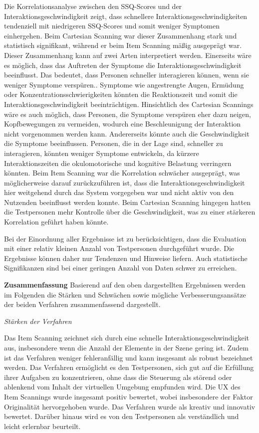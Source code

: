 Die Korrelationsanalyse zwischen den SSQ-Scores und der Interaktionsgeschwindigkeit zeigt, dass schnellere Interaktionsgeschwindigkeiten tendenziell mit niedrigeren SSQ-Scores und somit weniger Symptomen einhergehen. Beim Cartesian Scanning war dieser Zusammenhang stark und statistisch signifikant, während er beim Item Scanning mäßig ausgeprägt war. Dieser Zusammenhang kann auf zwei Arten interpretiert werden. Einerseits wäre es möglich, dass das Auftreten der Symptome die Interaktionsgeschwindigkeit beeinflusst. Das bedeutet, dass Personen schneller interagieren können, wenn sie weniger Symptome verspüren.. Symptome wie angestrengte Augen, Ermüdung oder Konzentrationsschwierigkeiten könnten die Reaktionszeit und somit die Interaktionsgeschwindigkeit beeinträchtigen. Hinsichtlich des Cartesian Scannings wäre es auch möglich, dass Personen, die Symptome verspüren eher dazu neigen, Kopfbewegungen zu vermeiden, wodurch eine Beschleunigung der Interaktion nicht vorgenommen werden kann. Andererseits könnte auch die Geschwindigkeit die Symptome beeinflussen. Personen, die in der Lage sind, schneller zu interagieren, könnten weniger Symptome entwickeln, da kürzere Interaktionszeiten die okulomotorische und kognitive Belastung verringern könnten.
Beim Item Scanning war die Korrelation schwächer ausgeprägt, was möglicherweise darauf zurückzuführen ist, dass die Interaktionsgeschwindigkeit hier weitgehend durch das System vorgegeben war und nicht aktiv von den Nutzenden beeinflusst werden konnte. Beim Cartesian Scanning hingegen hatten die Testpersonen mehr Kontrolle über die Geschwindigkeit, was zu einer stärkeren Korrelation geführt haben könnte.

Bei der Einordnung aller Ergebnisse ist zu berücksichtigen, dass die Evaluation mit einer relativ kleinen Anzahl von Testpersonen durchgeführt wurde. Die Ergebnisse können daher nur Tendenzen und Hinweise liefern. Auch statistische Signifikanzen sind bei einer geringen Anzahl von Daten schwer zu erreichen. 

\textbf{Zusammenfassung}
Basierend auf den oben dargestellten Ergebnissen werden im Folgenden die Stärken und Schwächen sowie mögliche Verbesserungsansätze der beiden Verfahren zusammenfassend dargestellt.

\textit{Stärken der Verfahren}

Das Item Scanning zeichnet sich durch eine schnelle Interaktionsgeschwindigkeit aus, insbesondere wenn die Anzahl der Elemente in der Szene gering ist. Zudem ist das Verfahren weniger fehleranfällig und kann insgesamt als robust bezeichnet werden. Das Verfahren ermöglicht es den Testpersonen, sich gut auf die Erfüllung ihrer Aufgaben zu konzentrieren, ohne dass die Steuerung als störend oder ablenkend vom Inhalt der virtuellen Umgebung empfunden wird. Die UX des Item Scannings wurde insgesamt positiv bewertet, wobei insbesondere der Faktor Originalität hervorgehoben wurde. Das Verfahren wurde als kreativ und innovativ bewertet. Darüber hinaus wird es von den Testpersonen als verständlich und leicht erlernbar beurteilt. 

